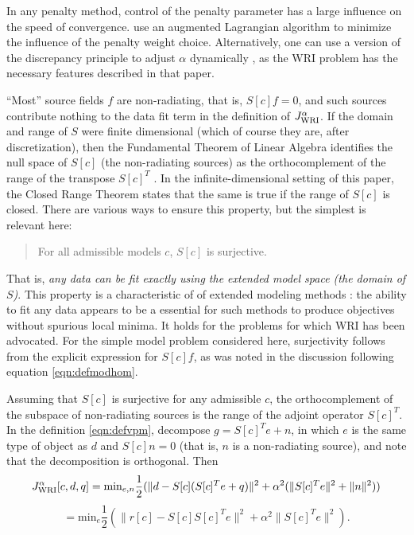 In any penalty method, control of the penalty
parameter has a large influence on the speed of
convergence. \cite{Aghamiry:19} use an augmented Lagrangian algorithm
to minimize the influence of the penalty weight choice. Alternatively, one can use a version of the discrepancy principle to adjust $\alpha$ dynamically \cite[]{FuSymes2017discrepancy}, as the WRI problem has the necessary features described in that paper.

``Most'' source fields $f$ are non-radiating, that is, $S[c]f=0$, and
such sources contribute nothing to the data fit term in the definition
of $J_{\rm WRI}^{\alpha}$. If the domain and range of $S$ were finite
dimensional (which of course they are, after discretization), then the
Fundamental Theorem of Linear Algebra identifies the null space of
$S[c]$ (the non-radiating sources) as the orthocomplement of the range
of the transpose $S[c]^T$ \cite[]{Strang:93}. In the
infinite-dimensional setting of this paper, the Closed Range Theorem
\cite[]{Yosida} states that the same is true if the range of $S[c]$ is
closed. There are various ways to ensure this property, but the
simplest is relevant here:
\begin{quote}
  For all admissible models $c$, $S[c]$ is surjective.
\end{quote}
That is, {\em any data can be fit exactly using the extended model
  space (the domain of $S$)}.
This property is a characteristic of of extended modeling
methods \cite[]{geoprosp:2008}: the ability to fit any data appears to
be a essential for such methods to produce objectives
without spurious local minima. It holds for the problems for which WRI
has been advocated. For the simple model problem considered
here, surjectivity follows from the explicit expression for $S[c]f$,
as was noted in the discussion following equation \ref{eqn:defmodhom}.

Assuming that $S[c]$ is surjective for any admissible $c$, the
orthocomplement of the subspace of non-radiating sources is the range
of the adjoint operator $S[c]^T$. In the
definition \ref{eqn:defvpm}, decompose $g = S[c]^Te + n$, in
which $e$ is the same type of object as $d$ and $S[c]n=0$ (that is,
$n$ is a non-radiating source), and note that the decomposition is
orthogonal. Then
\[
  J_{\rm WRI}^{\alpha}[c,d,q] =
  \mbox{min}_{e,n} \frac{1}{2}(\| d-S[c](S[c]^Te+q)\|^2+\alpha^2(\|S[c]^Te\|^2+\|n\|^2))
  \]
\begin{equation}
  \label{eqn:defvpmred}
 =  \mbox{min}_{e} \frac{1}{2}(\|r[c]-S[c]S[c]^Te\|^2+\alpha^2\|S[c]^Te\|^2).
 \end{equation}
 
